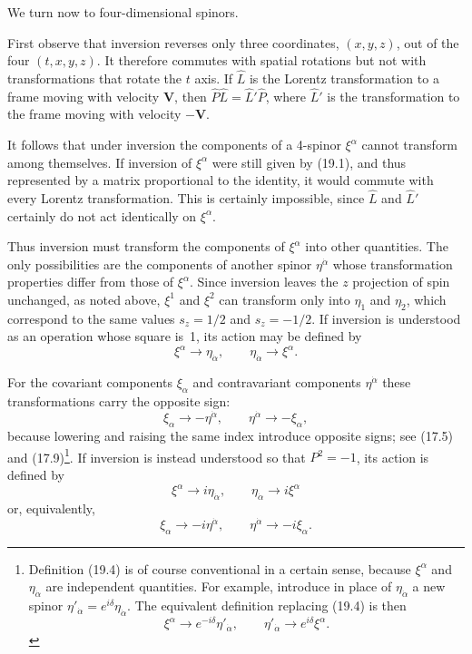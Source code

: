 We turn now to four-dimensional spinors.

First observe that inversion reverses only three coordinates, $(x,y,z)$, out of the four $(t,x,y,z)$. It therefore commutes with spatial rotations but not with transformations that rotate the $t$ axis. If $\widehat L$ is the Lorentz transformation to a frame moving with velocity $\mathbf V$, then $\widehat P\widehat L=\widehat L'\widehat P$, where $\widehat L'$ is the transformation to the frame moving with velocity $-\mathbf V$.

It follows that under inversion the components of a 4-spinor $\xi^\alpha$ cannot transform among themselves. If inversion of $\xi^\alpha$ were still given by (19.1), and thus represented by a matrix proportional to the identity, it would commute with every Lorentz transformation. This is certainly impossible, since $\widehat L$ and $\widehat L'$ certainly do not act identically on $\xi^\alpha$.

Thus inversion must transform the components of $\xi^\alpha$ into other quantities. The only possibilities are the components of another spinor $\eta^{\dot\alpha}$ whose transformation properties differ from those of $\xi^\alpha$. Since inversion leaves the $z$ projection of spin unchanged, as noted above, $\xi^1$ and $\xi^2$ can transform only into $\eta_{\dot1}$ and $\eta_{\dot2}$, which correspond to the same values $s_z=1/2$ and $s_z=-1/2$. If inversion is understood as an operation whose square is~1, its action may be defined by
\begin{equation}
\xi^\alpha\to\eta_{\dot\alpha},\qquad
\eta_{\dot\alpha}\to\xi^\alpha.
\tag{19.4}
\end{equation}

For the covariant components $\xi_\alpha$ and contravariant components $\eta^{\dot\alpha}$ these transformations carry the opposite sign:
\begin{equation}
\xi_\alpha\to-\eta^{\dot\alpha},\qquad
\eta^{\dot\alpha}\to-\xi_\alpha,
\tag{19.4a}
\end{equation}
because lowering and raising the same index introduce opposite signs; see (17.5) and (17.9)\footnote{Definition (19.4) is of course conventional in a certain sense, because $\xi^\alpha$ and $\eta_{\dot\alpha}$ are independent quantities. For example, introduce in place of $\eta_{\dot\alpha}$ a new spinor $\eta'_{\dot\alpha}=e^{i\delta}\eta_{\dot\alpha}$. The equivalent definition replacing (19.4) is then
\[
\xi^\alpha\to e^{-i\delta}\eta'_{\dot\alpha},\qquad
\eta'_{\dot\alpha}\to e^{i\delta}\xi^\alpha.
\]}. If inversion is instead understood so that $P^2=-1$, its action is defined by
\begin{equation}
\xi^\alpha\to i\eta_{\dot\alpha},\qquad
\eta_{\dot\alpha}\to i\xi^\alpha
\tag{19.5}
\end{equation}
or, equivalently,
\begin{equation}
\xi_\alpha\to-i\eta^{\dot\alpha},\qquad
\eta^{\dot\alpha}\to-i\xi_\alpha.
\tag{19.5a}
\end{equation}

